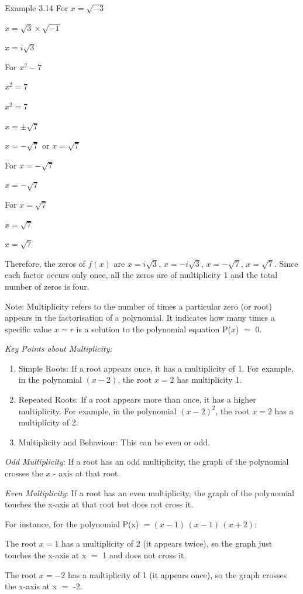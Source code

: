 \begin{example}{Example 3.14}
For $x = \sqrt{-3}$

$x = \sqrt{3} \times \sqrt{-1}$

$x = i\sqrt{3}$

For $x^2 - 7$

$x^2 = 7$

$x^2 = 7$

$x = \pm\sqrt{7}$

$x = -\sqrt{7}$ or $x = \sqrt{7}$

For $x = -\sqrt{7}$

$x = -\sqrt{7}$

For $x = \sqrt{7}$

$x = \sqrt{7}$

$x = \sqrt{7}$

Therefore, the zeros of $f(x)$ are $x = i\sqrt{3}$, $x = -i\sqrt{3}$, $x = -\sqrt{7}$,
$x = \sqrt{7}$. Since each factor occurs only once, all the zeros are of multiplicity
1 and the total number of zeros is four.
\end{example}

Note: Multiplicity refers to the number of times a particular zero (or root) appears
in the factorisation of a polynomial. It indicates how many times a specific value
$x = r$ is a solution to the polynomial equation P($x$) $=$ 0.

\noindent\textit{\color{blue}Key Points about Multiplicity:}
\begin{enumerate}
  \item Simple Roots: If a root appears once, it has a multiplicity of 1. For example,
  in the polynomial $(x - 2)$, the root $x = 2$ has multiplicity 1.
  \item Repeated Roots: If a root appears more than once, it has a higher multiplicity.
  For example, in the polynomial $(x - 2)^2$, the root $x = 2$ has a multiplicity of
  2.
  \item Multiplicity and Behaviour: This can be even or odd.
\end{enumerate}
\textit{Odd Multiplicity}: If a root has an odd multiplicity, the graph of the polynomial
crosses the $x$ - axis at that root.

\textit{Even Multiplicity}: If a root has an even multiplicity, the graph of the polynomial
touches the x-axis at that root but does not cross it.

For instance, for the polynomial P(x) $= (x - 1)\,(x - 1)\,(x + 2)$:

The root $x = 1$ has a multiplicity of 2 (it appears twice), so the graph just touches
the x-axis at x $=$ 1 and does not cross it.

The root $x = -2$ has a multiplicity of 1 (it appears once), so the graph crosses the
x-axis at x $=$ -2.
